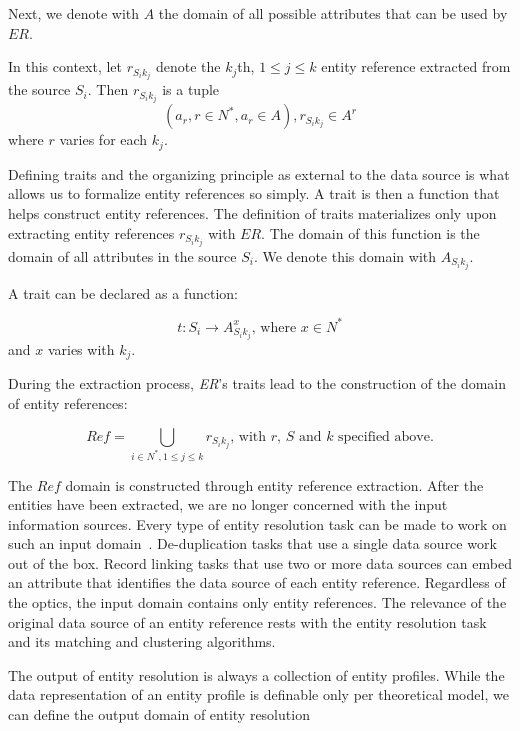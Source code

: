 \documentclass[journal]{IEEEtran}
\begin{document}
    Next, we denote with $A$ the domain of all possible attributes that can be
    used by $ER$.

    In this context, let $r_{{S_i}{k_j}}$ denote the $k_j$th, $1 \leq j \leq k$
    entity reference extracted from the source $S_i$.
    Then $r_{{S_i}{k_j}}$ is a tuple
    \[
        (a_r, r \in N^*, a_r \in A), r_{{S_i}{k_j}} \in A^r
    \]
    where $r$ varies for each $k_j$.

    Defining traits and the organizing principle as external to the data source
    is what allows us to formalize entity references so simply.
    A trait is then a function that helps construct entity references.
    The definition of traits materializes only upon extracting entity references
    $r_{{S_i}{k_j}}$ with $ER$.
    The domain of this function is the domain of all attributes in the source
    $S_i$.
    We denote this domain with $A_{{S_i}{k_j}}$.
    
    A trait can be declared as a function:

    \[
        t: S_i \rightarrow A_{{S_i}{k_j}}^x\textrm{, where }x \in N^*
    \]
    and $x$ varies with $k_j$.

    During the extraction process, \textit{ER}'s traits lead to the construction
    of the domain of entity references:

    \[
        Ref = \bigcup_{i \in N^*,1 \leq j \leq k} r_{{S_i}{k_j}}
        \textrm{, with } r \textrm{, }S \textrm{ and } k \textrm{ specified above.}
    \]

    The $Ref$ domain is constructed through entity reference extraction.
    After the entities have been extracted, we are no longer concerned with the
    input information sources.
    Every type of entity resolution task can be made to work on such an input
    domain~\cite{Pap19}.
    De-duplication tasks that use a single data source work out of the box.
    Record linking tasks that use two or more data sources can embed an
    attribute that identifies the data source of each entity reference.
    Regardless of the optics, the input domain contains only entity references.
    The relevance of the original data source of an entity reference rests with
    the entity resolution task and its matching and clustering algorithms.

    The output of entity resolution is always a collection of entity profiles.
    While the data representation of an entity profile is definable only per
    theoretical model, we can define the output domain of entity resolution
\end{document}
